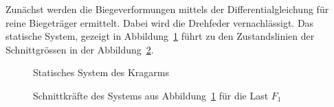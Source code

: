 \documentclass[
  10pt,
  letterpaper,
]{scrreprt}
\begin{document}
Zunächst werden die Biegeverformungen mittels der Differentialgleichung
für reine Biegeträger ermittelt. Dabei wird die Drehfeder
vernachlässigt. Das statische System, gezeigt in
Abbildung~\ref{fig-kragarm-sys} führt zu den Zustandslinien der
Schnittgrössen in der Abbildung~\ref{fig-skkragarmreal}.

\begin{figure}[H]


\caption{\label{fig-kragarm-sys}Statisches System des Kragarms}

\end{figure}%

\begin{figure}[H]


\caption{\label{fig-skkragarmreal}Schnittkräfte des Systems aus
Abbildung~\ref{fig-kragarm-sys} für die Last \(F_1\)}

\end{figure}%
\end{document}
